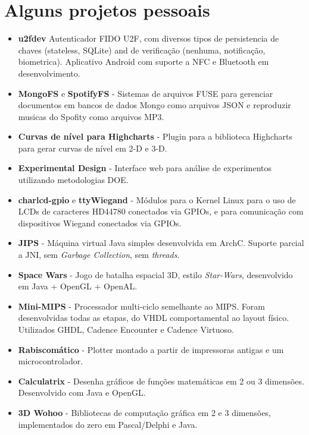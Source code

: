 \documentclass[a4paper,10pt]{article}
\begin{document}
  \section{Alguns projetos pessoais}
    \begin{itemize}
      \item
        \textbf{u2fdev} Autenticador FIDO U2F, com diversos tipos de persistencia de chaves (stateless, SQLite) and de verificação (nenhuma, notificação, biometrica). Aplicativo Android com suporte a NFC e Bluetooth em desenvolvimento.

      \item
        \textbf{MongoFS} e \textbf{SpotifyFS} - Sistemas de arquivos FUSE para gerenciar documentos em bancos de dados Mongo como arquivos JSON e reproduzir musicas do Spofity como arquivos MP3.

      \item 
        \textbf{Curvas de nível para Highcharts} - Plugin para a biblioteca Highcharts para gerar curvas de nível em 2-D e 3-D.
      
      \item 
        \textbf{Experimental Design} - Interface web para análise de experimentos utilizando metodologias DOE.
        
      \item 
        \textbf{charlcd-gpio} e \textbf{ttyWiegand} - Módulos para o Kernel Linux para o uso de LCDs de caracteres HD44780 conectados via GPIOs, e para comunicação com dispositivos Wiegand conectados via GPIOs.

      \item 
        \textbf{JIPS} - Máquina virtual Java simples desenvolvida em ArchC. Suporte parcial a JNI, sem \emph{Garbage Collection}, sem \emph{threads}.

      \item 
        \textbf{Space Wars} - Jogo de batalha espacial 3D, estilo \emph{Star-Wars}, desenvolvido em Java + OpenGL + OpenAL.

      \item 
        \textbf{Mini-MIPS} - Processador multi-ciclo semelhante ao MIPS. Foram desenvolvidas todas as etapas, do VHDL comportamental ao layout físico. Utilizados GHDL, Cadence Encounter e Cadence Virtuoso.

      \item 
        \textbf{Rabiscomático} - Plotter montado a partir de impressoras antigas e um microcontrolador.

      \item 
        \textbf{Calculatrix} - Desenha gráficos de funções matemáticas em 2 ou 3 dimensões. Desenvolvido com Java e OpenGL.

      \item 
        \textbf{3D Wohoo} - Bibliotecas de computação gráfica em 2 e 3 dimensões, implementados do zero em Pascal/Delphi e Java.

    \end{itemize}
\end{document}
